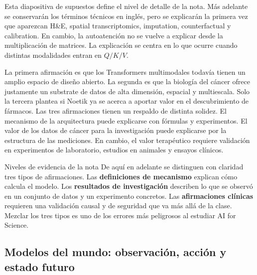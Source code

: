 Esta diapositiva de supuestos define el nivel de detalle de la nota. Más adelante se conservarán los términos técnicos en inglés, pero se explicarán la primera vez que aparezcan H\&E, spatial transcriptomics, imputation, counterfactual y calibration. En cambio, la autoatención no se vuelve a explicar desde la multiplicación de matrices. La explicación se centra en lo que ocurre cuando distintas modalidades entran en $Q/K/V$.


La primera afirmación es que los Transformers multimodales todavía tienen un amplio espacio de diseño abierto. La segunda es que la biología del cáncer ofrece justamente un substrate de datos de alta dimensión, espacial y multiescala. Solo la tercera plantea si Noetik ya se acerca a aportar valor en el descubrimiento de fármacos. Las tres afirmaciones tienen un respaldo de distinta solidez. El mecanismo de la arquitectura puede explicarse con fórmulas y experimentos. El valor de los datos de cáncer para la investigación puede explicarse por la estructura de las mediciones. En cambio, el valor terapéutico requiere validación en experimentos de laboratorio, estudios en animales y ensayos clínicos.


\begin{importantbox}{Niveles de evidencia de la nota}
De aquí en adelante se distinguen con claridad tres tipos de afirmaciones. Las \textbf{definiciones de mecanismo} explican cómo calcula el modelo. Los \textbf{resultados de investigación} describen lo que se observó en un conjunto de datos y un experimento concretos. Las \textbf{afirmaciones clínicas} requieren una validación causal y de seguridad que va más allá de la clase. Mezclar los tres tipos es uno de los errores más peligrosos al estudiar AI for Science.
\end{importantbox}

\subsection{Modelos del mundo: observación, acción y estado futuro}

